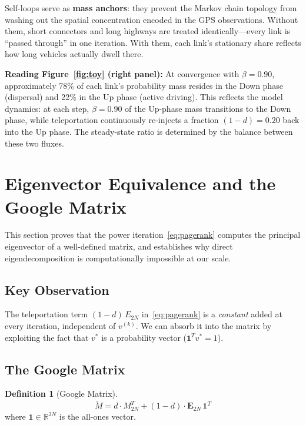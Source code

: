 \documentclass[12pt,a4paper]{article}
\theoremstyle{definition}
\newtheorem{definition}{Definition}[section]
\theoremstyle{plain}
\begin{document}
\begin{insight}
  Self-loops serve as \textbf{mass anchors}: they prevent the Markov chain topology from
  washing out the spatial concentration encoded in the GPS observations. Without them,
  short connectors and long highways are treated identically---every link is ``passed
  through'' in one iteration. With them, each link's stationary share reflects how long
  vehicles actually dwell there.
\end{insight}

\noindent\textbf{Reading Figure~\ref{fig:toy} (right panel):}
At convergence with $\beta=0.90$, approximately 78\% of each link's probability mass
resides in the Down phase (dispersal) and 22\% in the Up phase (active driving). This
reflects the model dynamics: at each step, $\beta=0.90$ of the Up-phase mass transitions
to the Down phase, while teleportation continuously re-injects a fraction $(1-d)=0.20$
back into the Up phase. The steady-state ratio is determined by the balance between
these two fluxes.

\section{Eigenvector Equivalence and the Google Matrix}
\label{sec:google}

This section proves that the power iteration~\eqref{eq:pagerank} computes the principal
eigenvector of a well-defined matrix, and establishes why direct eigendecomposition is
computationally impossible at our scale.

\subsection{Key Observation}

The teleportation term $(1-d)\,E_{2N}$ in~\eqref{eq:pagerank} is a \emph{constant}
added at every iteration, independent of $v^{(k)}$. We can absorb it into the matrix by
exploiting the fact that $v^*$ is a probability vector ($\bm{1}^T v^* = 1$).

\subsection{The Google Matrix}

\begin{definition}[Google Matrix]
  \label{def:google}
  \begin{equation}
    \boxed{
    \widetilde{M} = d \cdot M_{2N}^T + (1-d) \cdot \bm{E}_{2N}\,\bm{1}^T
    }
    \label{eq:google}
  \end{equation}
  where $\bm{1} \in \mathbb{R}^{2N}$ is the all-ones vector.
\end{definition}
\end{document}
